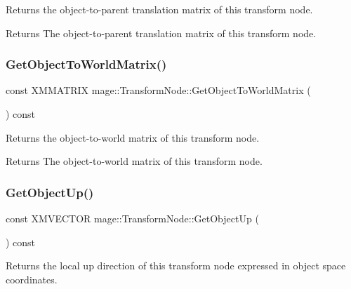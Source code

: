 Returns the object-\/to-\/parent translation matrix of this transform node.

\begin{DoxyReturn}{Returns}
The object-\/to-\/parent translation matrix of this transform node. 
\end{DoxyReturn}
\hypertarget{structmage_1_1_transform_node_a793fb089a973f6c03bcedabf58ce632e}{}\label{structmage_1_1_transform_node_a793fb089a973f6c03bcedabf58ce632e} 
\subsubsection{\texorpdfstring{Get\+Object\+To\+World\+Matrix()}{GetObjectToWorldMatrix()}}
{\footnotesize\ttfamily const X\+M\+M\+A\+T\+R\+IX mage\+::\+Transform\+Node\+::\+Get\+Object\+To\+World\+Matrix (\begin{DoxyParamCaption}{ }\end{DoxyParamCaption}) const\hspace{0.3cm}{\ttfamily [noexcept]}}

Returns the object-\/to-\/world matrix of this transform node.

\begin{DoxyReturn}{Returns}
The object-\/to-\/world matrix of this transform node. 
\end{DoxyReturn}
\hypertarget{structmage_1_1_transform_node_ab045712f4aa08651b2a43b1883e8c3fc}{}\label{structmage_1_1_transform_node_ab045712f4aa08651b2a43b1883e8c3fc} 
\subsubsection{\texorpdfstring{Get\+Object\+Up()}{GetObjectUp()}}
{\footnotesize\ttfamily const X\+M\+V\+E\+C\+T\+OR mage\+::\+Transform\+Node\+::\+Get\+Object\+Up (\begin{DoxyParamCaption}{ }\end{DoxyParamCaption}) const\hspace{0.3cm}{\ttfamily [noexcept]}}

Returns the local up direction of this transform node expressed in object space coordinates.

